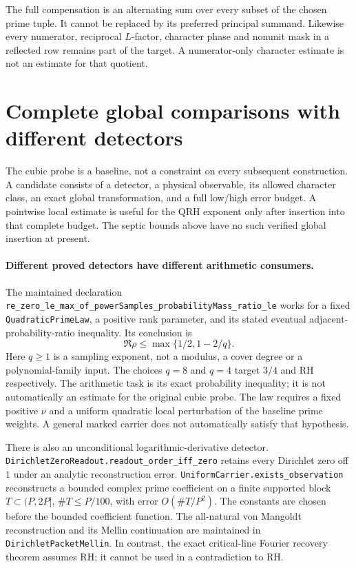 \documentclass[11pt]{article}
\begin{document}
The full compensation is an alternating sum over every subset of the
chosen prime tuple. It cannot be replaced by its preferred principal
summand. Likewise every numerator, reciprocal $L$-factor, character
phase and nonunit mask in a reflected row remains part of the target.
A numerator-only character estimate is not an estimate for that quotient.

\section{Complete global comparisons with different detectors}
\label{sec:global-comparisons}

The cubic probe is a baseline, not a constraint on every subsequent
construction. A candidate consists of a detector, a physical observable,
its allowed character class, an exact global transformation, and a full
low/high error budget. A pointwise local estimate is useful for the QRH
exponent only after insertion into that complete budget. The septic
bounds above have no such verified global insertion at present.

\paragraph{Different proved detectors have different arithmetic consumers.}
The maintained declaration
\texttt{re\_zero\_le\_max\_of\_powerSamples\_probabilityMass\_ratio\_le}
works for a fixed \texttt{QuadraticPrimeLaw}, a positive rank parameter,
and its stated eventual adjacent-probability-ratio inequality. Its
conclusion is
\[
 \Re\rho\le\max\{1/2,1-2/q\}.
\]
Here \(q\ge1\) is a sampling exponent, not a modulus, a cover degree or a
polynomial-family input. The choices \(q=8\) and \(q=4\) target \(3/4\)
and RH respectively. The arithmetic task is its exact probability
inequality; it is not automatically an estimate for the original cubic
probe. The law requires a fixed positive \(\nu\) and a uniform quadratic
local perturbation of the baseline prime weights. A general marked
carrier does not automatically satisfy that hypothesis.

There is also an unconditional logarithmic-derivative detector.
\texttt{DirichletZeroReadout.readout\_order\_iff\_zero} retains every
Dirichlet zero off \(1\) under an analytic reconstruction error.
\texttt{UniformCarrier.exists\_observation} reconstructs a bounded
complex prime coefficient on a finite supported block \(T\subset(P,2P]\),
\(\#T\le P/100\), with error \(O(\#T/P^2)\).
The constants are chosen before the bounded coefficient function.
The all-natural von Mangoldt reconstruction and its Mellin continuation
are maintained in \texttt{DirichletPacketMellin}.
In contrast, the exact critical-line Fourier recovery theorem assumes RH;
it cannot be used in a contradiction to RH.
\end{document}
